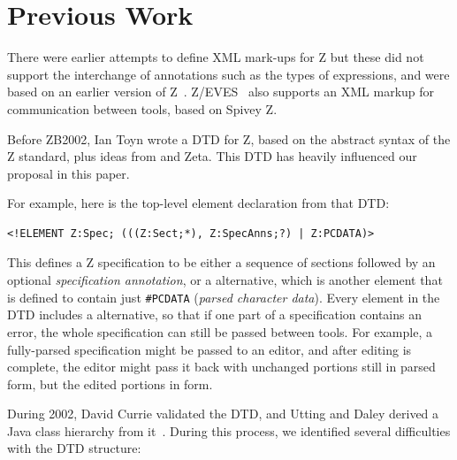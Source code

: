 \documentclass{llncs}  %
\newcommand{\Zeta}{Zeta}
\begin{document}
\section{Previous Work}

There were earlier attempts to define XML mark-ups for Z
\cite{Wordsworth99,Dong01} but these did not support the interchange of
annotations such as the types of expressions, and were based on an earlier
version of Z~\cite{spivey:z-notation2}. 
Z/EVES~\cite{saaltink:zeves-system} also supports an XML markup for
communication between tools, based on Spivey Z.

Before ZB2002, Ian Toyn wrote a DTD for Z, based on the abstract
syntax of the Z standard, plus ideas from \CADiZ and \Zeta.  This
DTD has heavily influenced our proposal in this paper.

For example, here is the top-level element declaration from that DTD:
\begin{small}
\begin{verbatim}
<!ELEMENT Z:Spec; (((Z:Sect;*), Z:SpecAnns;?) | Z:PCDATA)>
\end{verbatim}
\end{small}

This defines a Z specification to be either a sequence of sections
followed by an optional \emph{specification annotation}, or a
 alternative, which is another element that is defined 
to contain just \verb!#PCDATA! (\textit{parsed character data}).
Every element in the DTD includes a  alternative, so
that if one part of a specification contains an error, the whole
specification can still be passed between tools.  For example,
a fully-parsed specification might be passed to an editor, and after
editing is complete, the editor might pass it back with unchanged
portions still in parsed form, but the edited portions in 
form. 

During 2002, David Currie validated the DTD, and Utting and Daley
derived a Java class hierarchy from it~\cite{daley:report02}.
During this process, we identified several difficulties with the
DTD structure:
\end{document}
